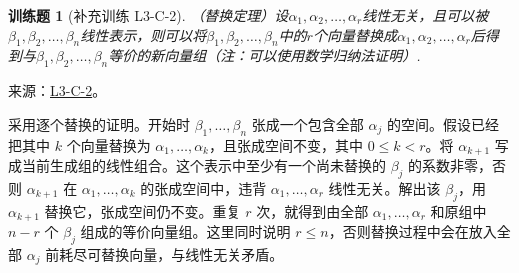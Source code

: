 \documentclass[UTF8,12pt,a4paper,fontset=fandol]{ctexart}
\newtheorem{exercise}{训练题}[section]
\begin{document}
\begin{exercise}[补充训练 L3-C-2]\label{prob:L3-C-2}
（替换定理）设$\alpha_1,\alpha_2,\ldots,\alpha_r$线性无关，且可以被$\beta_1,\beta_2,\ldots,\beta_n$线性表示，则可以将$\beta_1,\beta_2,\ldots,\beta_n$中的$r$个向量替换成$\alpha_1,\alpha_2,\ldots,\alpha_r$后得到与$\beta_1,\beta_2,\ldots,\beta_n$等价的新向量组（注：可以使用数学归纳法证明）.
\end{exercise}
\noindent 来源：\href{https://github.com/yhwu-is/Linear-Algebra-Left-Undone/blob/new/%E8%AE%B2%E4%B9%89/%E4%B8%93%E9%A2%98/3%20%E6%9C%89%E9%99%90%E7%BB%B4%E7%BA%BF%E6%80%A7%E7%A9%BA%E9%97%B4.tex}{L3-C-2}。
\begin{solve}
采用逐个替换的证明。开始时 $\beta_1,\ldots,\beta_n$ 张成一个包含全部 $\alpha_j$ 的空间。假设已经把其中 $k$ 个向量替换为 $\alpha_1,\ldots,\alpha_k$，且张成空间不变，其中 $0\le k<r$。将 $\alpha_{k+1}$ 写成当前生成组的线性组合。这个表示中至少有一个尚未替换的 $\beta_j$ 的系数非零，否则 $\alpha_{k+1}$ 在 $\alpha_1,\ldots,\alpha_k$ 的张成空间中，违背 $\alpha_1,\ldots,\alpha_r$ 线性无关。解出该 $\beta_j$，用 $\alpha_{k+1}$ 替换它，张成空间仍不变。重复 $r$ 次，就得到由全部 $\alpha_1,\ldots,\alpha_r$ 和原组中 $n-r$ 个 $\beta_j$ 组成的等价向量组。这里同时说明 $r\le n$，否则替换过程中会在放入全部 $\alpha_j$ 前耗尽可替换向量，与线性无关矛盾。
\end{solve}
\end{document}
